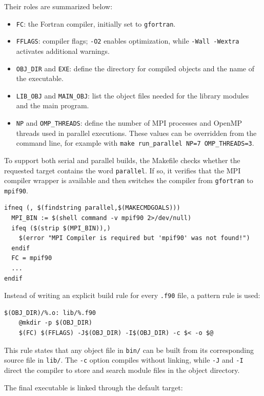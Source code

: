 Their roles are summarized below:

\begin{itemize}
  \item \texttt{FC}: the Fortran compiler, initially set to \texttt{gfortran}.
  \item \texttt{FFLAGS}: compiler flags; \texttt{-O2} enables optimization, while \texttt{-Wall -Wextra} activates additional warnings.
  \item \texttt{OBJ\_DIR} and \texttt{EXE}: define the directory for compiled objects and the name of the executable.
  \item \texttt{LIB\_OBJ} and \texttt{MAIN\_OBJ}: list the object files needed for the library modules and the main program.
  \item \texttt{NP} and \texttt{OMP\_THREADS}: define the number of MPI processes and OpenMP threads used in parallel executions. These values can be overridden from the command line, for example with \texttt{make run\_parallel NP=7 OMP\_THREADS=3}.
\end{itemize}

To support both serial and parallel builds, the Makefile checks whether the requested target contains the word \texttt{parallel}. If so, it verifies that the MPI compiler wrapper is available and then switches the compiler from \texttt{gfortran} to \texttt{mpif90}.

\begin{lstlisting}
ifneq (, $(findstring parallel,$(MAKECMDGOALS)))
  MPI_BIN := $(shell command -v mpif90 2>/dev/null)
  ifeq ($(strip $(MPI_BIN)),)
    $(error "MPI Compiler is required but 'mpif90' was not found!")
  endif
  FC = mpif90
  ...
endif
\end{lstlisting}

Instead of writing an explicit build rule for every \texttt{.f90} file, a pattern rule is used:

\begin{lstlisting}
$(OBJ_DIR)/%.o: lib/%.f90
    @mkdir -p $(OBJ_DIR)
    $(FC) $(FFLAGS) -J$(OBJ_DIR) -I$(OBJ_DIR) -c $< -o $@
\end{lstlisting}

This rule states that any object file in \texttt{bin/} can be built from its corresponding source file in \texttt{lib/}. The \texttt{-c} option compiles without linking, while \texttt{-J} and \texttt{-I} direct the compiler to store and search module files in the object directory.

The final executable is linked through the default target:

